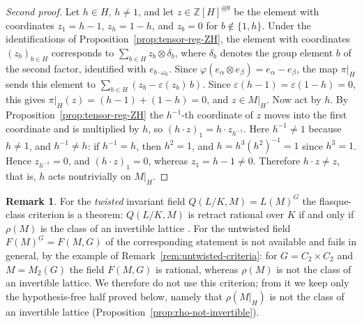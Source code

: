 \documentclass[12pt,a4paper]{article}
\newtheorem{theorem}{Theorem}[section]
\theoremstyle{definition}
\newtheorem{remark}[theorem]{Remark}
\begin{document}
\begin{proof}[Second proof]
Let \(h \in H\), \(h \neq 1\), and let \(z \in
\mathbb{Z}[H]^{\oplus 9}\) be the element with coordinates
\(z_1 = h - 1\), \(z_h = 1 - h\), and \(z_b = 0\) for
\(b \notin \{1, h\}\).  Under the identifications of
Proposition~\ref{prop:tensor-reg-ZH}, the element with coordinates
\((z_b)_{b \in H}\) corresponds to \(\sum_{b \in H} z_b \otimes
\delta_b\), where \(\delta_b\) denotes the group element \(b\) of the
second factor, identified with \(e_{b \cdot \omega_0}\).  Since
\(\varphi(e_\alpha \otimes e_\beta) = e_\alpha - e_\beta\), the map
\(\pi|_H\) sends this element to
\(\sum_{b \in H}(z_b - \varepsilon(z_b)\, b)\).  Since
\(\varepsilon(h - 1) = \varepsilon(1 - h) = 0\), this gives
\(\pi|_H(z) = (h - 1) + (1 - h) = 0\), and \(z \in M|_H\).
Now act by \(h\).  By Proposition~\ref{prop:tensor-reg-ZH} the
\(h^{-1}\)-th coordinate of \(z\) moves into the first coordinate and
is multiplied by \(h\), so \((h \cdot z)_1 = h \cdot z_{h^{-1}}\).
Here \(h^{-1} \neq 1\) because \(h \neq 1\), and \(h^{-1} \neq h\):
if \(h^{-1} = h\), then \(h^2 = 1\), and \(h = h^3 (h^2)^{-1} = 1\)
since \(h^3 = 1\).  Hence \(z_{h^{-1}} = 0\), and \((h \cdot z)_1 = 0\),
whereas \(z_1 = h - 1 \neq 0\).  Therefore \(h \cdot z \neq z\), that
is, \(h\) acts nontrivially on \(M|_H\).
\end{proof}


\begin{remark}\label{rem:twisted-criterion}
For the \emph{twisted} invariant field \(Q(L/K,M) = L(M)^G\) the
flasque-class criterion is a theorem: \(Q(L/K,M)\) is retract rational
over \(K\) if and only if \(\rho(M)\) is the class of an invertible
lattice \cite[Theorem~3.14(a)]{Saltman1984}.  For the untwisted field
\(F(M)^G = F(M,G)\) of \cite[p.~221]{Saltman1987} the corresponding
statement is not available and fails in general, by the example of
Remark~\ref{rem:untwisted-criteria}: for \(G = C_2 \times C_2\) and
\(M = M_2(G)\) the field \(F(M,G)\) is rational, whereas \(\rho(M)\) is
not the class of an invertible lattice.  We therefore do not use this
criterion; from it we keep only the hypothesis-free half proved below,
namely that \(\rho(M|_H)\) is not the class of an invertible lattice
(Proposition~\ref{prop:rho-not-invertible}).
\end{remark}
\end{document}
